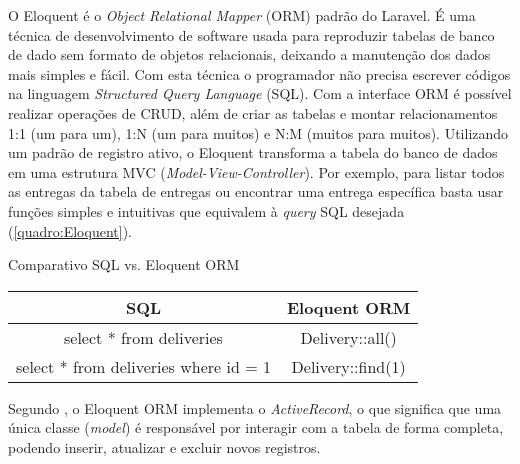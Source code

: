 O Eloquent é o \textit{Object Relational Mapper} (ORM) padrão do Laravel. É uma técnica de desenvolvimento de software usada para reproduzir tabelas de banco de dado sem formato de objetos relacionais, deixando a manutenção dos dados mais simples e fácil. Com esta técnica o programador não precisa escrever códigos na linguagem \textit{Structured Query Language} (SQL). Com a interface ORM é possível realizar operações de CRUD, além de criar as tabelas e montar relacionamentos 1:1 (um para um), 1:N (um para muitos) e N:M (muitos para muitos). Utilizando um padrão de registro ativo, o Eloquent transforma a tabela do banco de dados em uma estrutura MVC (\textit{Model-View-Controller}). Por exemplo, para listar todos as entregas da tabela de entregas ou encontrar uma entrega específica basta usar funções simples e intuitivas que equivalem à \textit{query} SQL desejada (\autoref{quadro:Eloquent}).

\begin{quadro}[H]
    \centering
    \caption{Comparativo SQL vs. Eloquent ORM
    \label{quadro:Eloquent}}
\begin{tabular}{|c|c|}
\hline
\textbf{SQL} & \textbf{Eloquent ORM} \\ \hline
select * from deliveries & Delivery::all() \\ \hline
select * from deliveries where id = 1 & Delivery::find(1) \\ \hline
\end{tabular}
\end{quadro}

Segundo , o Eloquent ORM implementa o \textit{ActiveRecord}, o que significa que uma única classe (\textit{model}) é responsável por interagir com a tabela de forma completa, podendo inserir, atualizar e excluir novos registros.